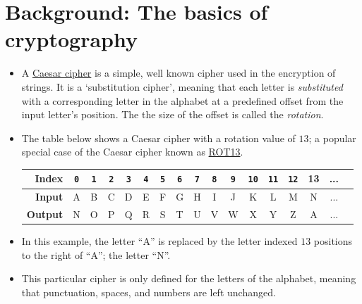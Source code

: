 \documentclass[11pt]{report}
\begin{document}
\section*{Background: The basics of cryptography}
\begin{itemize}
	\item A \href{https://en.wikipedia.org/wiki/Caesar_cipher}{Caesar cipher} is a simple, well known cipher used in the encryption of strings. It is a `substitution cipher', meaning that each letter is \emph{substituted} with a corresponding letter in the alphabet at a predefined offset from the input letter's position. The the size of the offset is called the \emph{rotation}.\\
	\item The table below shows a Caesar cipher with a rotation value of $13$; a popular special case of the Caesar cipher known as \href{https://www.wikiwand.com/en/ROT13}{ROT13}.
	\begin{table}[h]
		\centering
		\begin{tabular}{|r|c|c|c|c|c|c|c|c|c|c|c|c|c|c|c|c|}
		\hline
		\textbf{Index} & {\tt 0} & {\tt 1} & {\tt 2} & {\tt 3} & {\tt 4} & {\tt 5} & {\tt 6} & {\tt 7} & {\tt 8} & {\tt 9} & {\tt 10} & {\tt 11} & {\tt 12} & 13 & ... \\ \hline
		\textbf{Input} & A & B & C & D & E & F & G & H & I & J & K  & L  & M & N & ... \\ \hline
		\textbf{Output} & N & O & P & Q & R & S & T & U & V & W & X  & Y  & Z & A & ... \\ \hline
		\end{tabular}
	\end{table}
	\item In this example, the letter ``A'' is replaced by the letter indexed $13$ positions to the right of ``A''; the letter ``N''.
	\item This particular cipher is only defined for the letters of the alphabet, meaning that punctuation, spaces, and numbers are left unchanged.
\end{itemize}

\newpage
\end{document}
